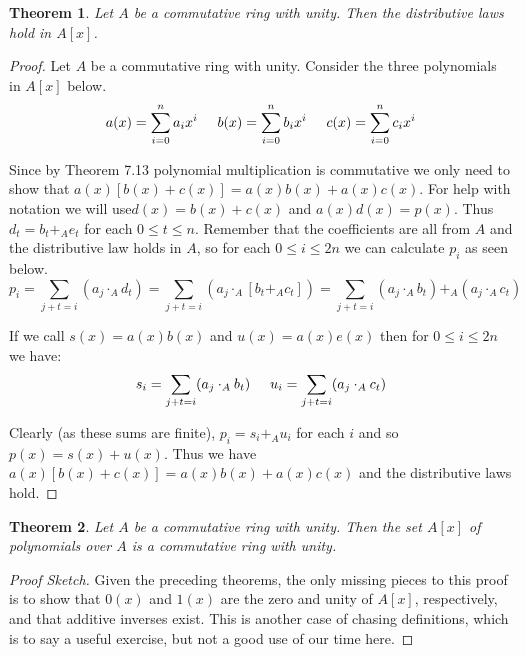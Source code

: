 \documentclass[letterpaper, 12pt]{article}
\newtheorem{thm}{Theorem}
\begin{document}
			\begin{thm}
			Let $A$ be a commutative ring with unity. 
			Then the distributive laws hold in $A[x]$.
			\end{thm}
			\color{ForestGreen}
			\begin{proof}
			Let $A$ be a commutative ring with unity. 
			Consider the three polynomials in $A[x]$ below.$$a(x) = \sum\limits_{i=0}^{n} a_{i}x^{i} \hspace{5mm} b(x) = \sum\limits_{i=0}^{n} b_{i}x^{i} \hspace{5mm} c(x) = \sum\limits_{i=0}^{n} c_{i}x^{i}$$
			
			Since by Theorem 7.13 polynomial multiplication is commutative we only need to show that $a(x)[b(x) +c(x)] = a(x)b(x) + a(x)c(x)$. 
			For help with notation we will use$ d(x) = b(x) + c(x)$ and $a(x)d(x) = p(x)$. 
			Thus $d_{t} = b_{t} +_{A} e_{t}$ for each $0 \leq t \leq n$. 
			Remember that the coefficients are all from $A$ and the distributive law holds in $A$, so for each $0 \leq i \leq 2n$ we can calculate $p_{i}$ as seen below.$$p_{i} = \sum\limits_{j+t=i} (a_{j} \cdot_{A} d_{t}) = \sum\limits_{j+t=i} (a_{j} \cdot_{A} [b_{t} +_{A} c_{t}]) = \sum\limits_{j+t=i} (a_{j} \cdot_{A} b_{t}) +_{A} (a_{j} \cdot_{A} c_{t})$$
			
			If we call $s(x) = a(x)b(x)$ and $u(x) = a(x)e(x)$ then for $0 \leq i \leq 2n$ we have:$$s_{i} = \sum\limits_{j+t=i} (a_{j} \cdot_{A} b_{t}) \hspace{5mm} u_{i} = \sum\limits_{j+t=i} (a_{j} \cdot_{A} c_{t})$$
			
			Clearly (as these sums are finite), $p_{i} = s_{i} +_{A} u_{i}$ for each $i$ and so $p(x) = s(x) + u(x)$. 
			Thus we have $a(x)[b(x) +c(x)] = a(x)b(x) +a(x)c(x)$ and the distributive laws hold.
			\end{proof}
			\color{black}

			\begin{thm}
			Let $A$ be a commutative ring with unity. 
			Then the set $A[x]$ of polynomials over $A$ is a commutative ring with unity.
			\end{thm}
			\color{blue}
			\begin{proof}[Proof Sketch]
			Given the preceding theorems, the only missing pieces to this proof is to show that $0(x)$ and $1(x)$ are the zero and unity of $A[x]$, respectively, and that additive inverses exist.
			This is another case of chasing definitions, which is to say a useful exercise, but not a good use of our time here.
			\end{proof}
			\color{black}
\end{document}
